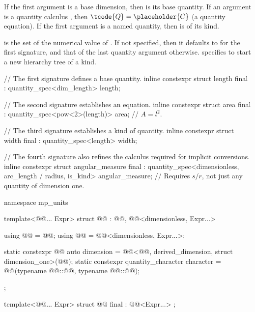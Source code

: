\pnum
If the first argument is a base dimension,
then  is its base quantity.
If an argument is a quantity calculus ,
then $\tcode{Q} = \placeholder{C}$ (a quantity equation).
If the first argument is a named quantity,
then  is of its kind.

\pnum
{} is the set of the numerical value of .
If not specified, then it defaults to  for the first signature,
and that of the last quantity argument otherwise.
 specifies  to start a new hierarchy tree of a kind.

\pnum
\begin{example}
\begin{codeblock}
// The first signature defines a base quantity.
inline constexpr struct length final : quantity_spec<dim_length> {
} length;

// The second signature establishes an equation.
inline constexpr struct area final : quantity_spec<pow<2>(length)> {
} area;  // $A = l^2$.

// The third signature establishes a kind of quantity.
inline constexpr struct width final : quantity_spec<length> {
} width;

// The fourth signature also refines the calculus required for implicit conversions.
inline constexpr struct angular_measure final :
    quantity_spec<dimensionless, arc_length / radius, is_kind> {
} angular_measure;  // Requires $s/r$, not just any quantity of dimension one.
\end{codeblock}
\end{example}

\begin{codeblock}
namespace mp_units {

template<@@... Expr>
struct @@ :
    @@,
    @@<dimensionless, Expr...> {
  using @@ = @@;
  using @@ = @@<dimensionless, Expr...>;

  static constexpr @@ auto dimension =
    @@<@@, derived_dimension, struct dimension_one>(@@{});
  static constexpr quantity_character character =
    @@(typename @@::@@{}, typename @@::@@{});
};

template<@@... Expr>
struct @@ final : @@<Expr...> {};

}
\end{codeblock}

